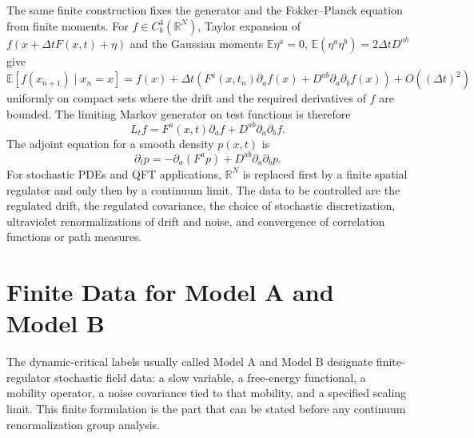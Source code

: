 The same finite construction fixes the generator and the Fokker--Planck
equation from finite moments.  For
\(f\in C_b^4(\mathbb R^N)\), Taylor expansion of
\(f(x+\Delta t F(x,t)+\eta)\) and the Gaussian moments
\(\mathbb E\eta^a=0\),
\(\mathbb E(\eta^a\eta^b)=2\Delta t D^{ab}\) give
\begin{equation}
  \mathbb E[f(x_{n+1})\mid x_n=x]
  =
  f(x)
  +
  \Delta t
  \left(F^a(x,t_n)\partial_a f(x)
  +D^{ab}\partial_a\partial_b f(x)\right)
  +O((\Delta t)^2)
  \label{eq:finite-langevin-generator-expansion}
\end{equation}
uniformly on compact sets where the drift and the required derivatives of
\(f\) are bounded.  The limiting Markov generator on test functions is
therefore
\begin{equation}
  L_t f=F^a(x,t)\partial_a f+D^{ab}\partial_a\partial_b f .
  \label{eq:finite-langevin-generator}
\end{equation}
The adjoint equation for a smooth density \(p(x,t)\) is
\begin{equation}
  \partial_t p
  =
  -\partial_a(F^a p)
  +D^{ab}\partial_a\partial_b p .
  \label{eq:finite-langevin-fokker-planck}
\end{equation}
For stochastic PDEs and QFT applications, \(\mathbb R^N\) is replaced first
by a finite spatial regulator and only then by a continuum limit.  The data
to be controlled are the regulated drift, the regulated covariance, the
choice of stochastic discretization, ultraviolet renormalizations of drift
and noise, and convergence of correlation functions or path measures.

\section{Finite Data for Model A and Model B}
\label{sec:finite-model-a-model-b-data}

The dynamic-critical labels usually called Model A and Model B designate
finite-regulator stochastic field data: a slow variable, a free-energy
functional, a mobility operator, a noise covariance tied to that mobility,
and a specified scaling limit.  This finite formulation is the part that can
be stated before any continuum renormalization group analysis.

